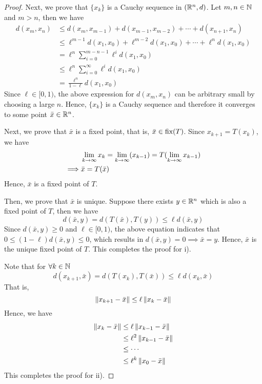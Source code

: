 \documentclass[a4 paper, 12pt]{article}
\begin{document}
\begin{proof}
Next, we prove that $\{x_k\}$ is a Cauchy sequence in $(\mathbb{R}^n,d)$. Let $m,n\in\mathbb{N}$ and $m>n$, then we have
\begin{equation}\label{eq:E1.02Cauchy}
        \begin{aligned}
                d(x_m, x_n) &\leq d(x_m,x_{m-1}) + d(x_{m-1},x_{m-2}) + \cdots + d(x_{n+1},x_n) \\ 
                &\leq \ell^{m-1}d(x_1,x_0) + \ell^{m-2}d(x_1,x_0) + \cdots + \ell^n d(x_1,x_0) \\
                &= \ell^n \sum_{i=0}^{m-n-1}\ell^i d(x_1,x_0) \\
                &\leq \ell^n \sum_{i=0}^{\infty}\ell^i d(x_1,x_0) \\
                &= \frac{\ell^n}{1-\ell}d(x_1,x_0)
        \end{aligned}
\end{equation}
Since $\ell \in [0,1)$, the above expression for $d(x_m,x_n)$ can be arbitrary small by choosing a large $n$. Hence, $\{x_k\}$ is a Cauchy sequence and therefore it converges to some point $\bar x \in \mathbb{R}^n$.

Next, we prove that $\bar x$ is a fixed point, that is, $\bar x \in \textnormal{fix}(T)$. Since $x_{k+1} = T(x_k)$, we have
\begin{align}
        &\lim_{k\rightarrow\infty}x_k = \lim_{k\rightarrow\infty}(x_{k-1}) = T(\lim_{k\rightarrow\infty}x_{k-1}) \\
        \implies &\bar x = T(\bar x) \label{eq:E1.02fixed}
\end{align}
Hence, $\bar x$ is a fixed point of $T$.

Then, we prove that $\bar x$ is unique. Suppose there exists $y \in \mathbb{R}^n$ which is also a fixed point of $T$, then we have
\begin{equation}\label{eq:E1.02Uni}
        d(\bar x, y) = d(T(\bar x), T(y)) \leq \ell d(\bar x, y)
\end{equation}
Since $d(\bar x, y) \geq 0$ and $\ell \in [0,1)$, the above equation indicates that $0 \leq (1-\ell)d(\bar x,y) \leq 0$, which results in $d(\bar x, y) = 0 \implies \bar x = y$. Hence, $\bar x$ is the unique fixed point of $T$. This completes the proof for i).

Note that for $\forall k\in\mathbb{N}$
\begin{equation}
        d(x_{k+1},\bar x) = d(T(x_k), T(\bar x)) \leq \ell d(x_k,\bar x) 
\end{equation}
That is,
\begin{equation}
        \left\|x_{k+1}-\bar x\right\| \leq \ell\left\|x_k-\bar x\right\|
\end{equation}
Hence, we have
\begin{equation}
        \begin{aligned}
                \left\|x_{k}-\bar x\right\| &\leq \ell\left\|x_{k-1}-\bar x\right\| \\
                &\leq \ell^2\left\|x_{k-1}-\bar x\right\| \\
                &\leq \cdots \\
                &\leq \ell^k\left\|x_0-\bar x\right\|
        \end{aligned}
\end{equation}
This completes the proof for ii).


\end{proof}
\end{document}
